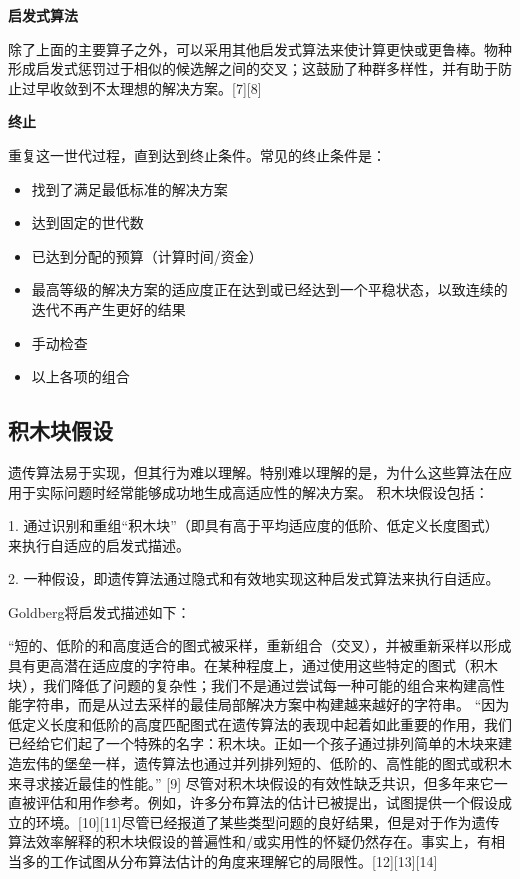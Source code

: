 \textbf{启发式算法}

除了上面的主要算子之外，可以采用其他启发式算法来使计算更快或更鲁棒。物种形成启发式惩罚过于相似的候选解之间的交叉；这鼓励了种群多样性，并有助于防止过早收敛到不太理想的解决方案。[7][8]

\textbf{终止}

重复这一世代过程，直到达到终止条件。常见的终止条件是：
\begin{itemize}
\item 找到了满足最低标准的解决方案
\item 达到固定的世代数
\item 已达到分配的预算（计算时间/资金）
\item 最高等级的解决方案的适应度正在达到或已经达到一个平稳状态，以致连续的迭代不再产生更好的结果
\item 手动检查
\item 以上各项的组合
\end{itemize}

\subsection{积木块假设}
遗传算法易于实现，但其行为难以理解。特别难以理解的是，为什么这些算法在应用于实际问题时经常能够成功地生成高适应性的解决方案。 积木块假设包括：

1.    通过识别和重组“积木块”（即具有高于平均适应度的低阶、低定义长度图式）来执行自适应的启发式描述。

2.    一种假设，即遗传算法通过隐式和有效地实现这种启发式算法来执行自适应。

Goldberg将启发式描述如下：

“短的、低阶的和高度适合的图式被采样，重新组合（交叉），并被重新采样以形成具有更高潜在适应度的字符串。在某种程度上，通过使用这些特定的图式（积木块），我们降低了问题的复杂性；我们不是通过尝试每一种可能的组合来构建高性能字符串，而是从过去采样的最佳局部解决方案中构建越来越好的字符串。 “因为低定义长度和低阶的高度匹配图式在遗传算法的表现中起着如此重要的作用，我们已经给它们起了一个特殊的名字：积木块。正如一个孩子通过排列简单的木块来建造宏伟的堡垒一样，遗传算法也通过并列排列短的、低阶的、高性能的图式或积木来寻求接近最佳的性能。” [9]
尽管对积木块假设的有效性缺乏共识，但多年来它一直被评估和用作参考。例如，许多分布算法的估计已被提出，试图提供一个假设成立的环境。[10][11]尽管已经报道了某些类型问题的良好结果，但是对于作为遗传算法效率解释的积木块假设的普遍性和/或实用性的怀疑仍然存在。事实上，有相当多的工作试图从分布算法估计的角度来理解它的局限性。[12][13][14]

